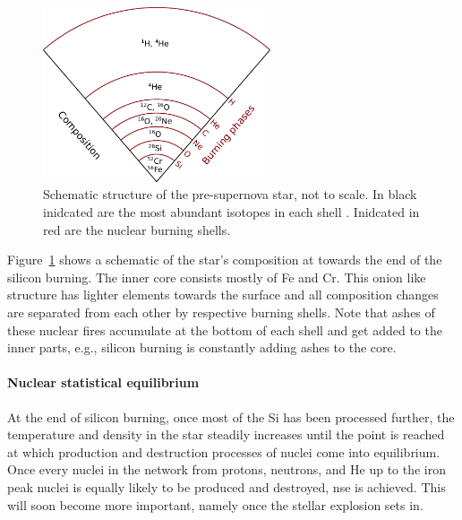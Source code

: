 \begin{figure}[tb]
    \centering
    \includegraphics[width=0.6\textwidth]{graphics/massive_stars/pre-supernova}
    \caption{Schematic structure of the pre-supernova star, not to scale. In black inidcated are the most abundant isotopes in each shell \citep{limongi2000}. Inidcated in red are the nuclear burning shells.}
    \label{fig:massive_stars:pre-supernova_structure_schematic}
\end{figure}
Figure~\ref{fig:massive_stars:pre-supernova_structure_schematic} shows a schematic of the star's composition at towards the end of the silicon burning. The inner core consists mostly of Fe and Cr. This onion like structure has lighter elements towards the surface and all composition changes are separated from each other by respective burning shells. Note that ashes of these nuclear fires accumulate at the bottom of each shell and get added to the inner parts, e.g., silicon burning is constantly adding ashes to the core.


\paragraph{Nuclear statistical equilibrium}
At the end of silicon burning, once most of the Si has been processed further, the temperature and density in the star steadily increases until the point is reached at which production and destruction processes of nuclei come into equilibrium. Once every nuclei in the network from protons, neutrons, and He up to the iron peak nuclei is equally likely to be produced and destroyed, \ac{nse} is achieved. This will soon become more important, namely once the stellar explosion sets in.


